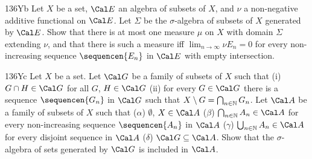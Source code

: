 {\spheader 136Yb Let $X$ be a set, $\Cal E$ an algebra of subsets of $X$,
and $\nu$ a non-negative additive functional on $\Cal E$.   Let $\Sigma$
be the $\sigma$-algebra of subsets of $X$ generated by $\Cal E$.   Show
that there is at most one measure $\mu$ on $X$ with domain $\Sigma$
extending $\nu$, and that there is such a measure iff
$\lim_{n\to\infty}\nu E_n=0$ for every non-increasing sequence
$\sequencen{E_n}$ in $\Cal E$ with empty intersection.

\spheader 136Yc Let $X$ be a set.   Let $\Cal G$ be a family of subsets
of $X$ such that (i)  $G\cap H\in\Cal G$ for all $G$, $H\in\Cal G$ (ii)
for every $G\in\Cal G$ there is a sequence $\sequencen{G_n}$ in $\Cal G$
such that $X\setminus G=\bigcap_{n\in\Bbb N}G_n$.   Let $\Cal A$ be a
family of subsets of $X$ such that ($\alpha$) $\emptyset$, $X\in\Cal A$
($\beta$) $\bigcap_{n\in\Bbb N}A_n\in\Cal A$
for every non-increasing sequence $\sequencen{A_n}$ in
$\Cal A$ ($\gamma$) $\bigcup_{n\in\Bbb N}A_n\in\Cal A$ for every
disjoint sequence in $\Cal A$ ($\delta$) $\Cal G\subseteq\Cal A$.   Show
that the $\sigma$-algebra of sets generated by $\Cal G$ is included in
$\Cal A$.
}%

